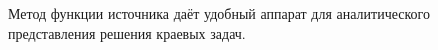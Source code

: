Метод функции источника даёт удобный аппарат для аналитического представления решения краевых задач. 
